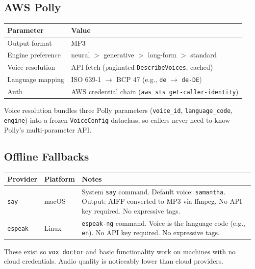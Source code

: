 \documentclass[a4paper,10pt]{article}
\newcommand{\field}[1]{\texttt{#1}}
\begin{document}
\subsection{AWS Polly}

\begin{center}
\begin{tabular}{ll}
\toprule
\textbf{Parameter} & \textbf{Value} \\
\midrule
Output format   & MP3 \\
Engine preference & neural $>$ generative $>$ long-form $>$ standard \\
Voice resolution & API fetch (paginated \texttt{DescribeVoices}, cached) \\
Language mapping & ISO 639-1 $\to$ BCP 47 (e.g., \texttt{de} $\to$
  \texttt{de-DE}) \\
Auth            & AWS credential chain (\texttt{aws sts
  get-caller-identity}) \\
\bottomrule
\end{tabular}
\end{center}

Voice resolution bundles three Polly parameters
(\field{voice\_id}, \field{language\_code}, \field{engine}) into
a frozen \texttt{VoiceConfig} dataclass, so callers never need to
know Polly's multi-parameter API.

\subsection{Offline Fallbacks}

\begin{center}
\begin{tabular}{llp{6cm}}
\toprule
\textbf{Provider} & \textbf{Platform} & \textbf{Notes} \\
\midrule
\texttt{say}     & macOS & System \texttt{say} command.  Default voice:
  \texttt{samantha}.  Output: AIFF converted to MP3 via ffmpeg.
  No API key required.  No expressive tags. \\
\texttt{espeak}  & Linux & \texttt{espeak-ng} command.  Voice is the
  language code (e.g., \texttt{en}).  No API key required.  No
  expressive tags. \\
\bottomrule
\end{tabular}
\end{center}

These exist so \texttt{vox doctor} and basic functionality work
on machines with no cloud credentials.  Audio quality is
noticeably lower than cloud providers.
\end{document}
